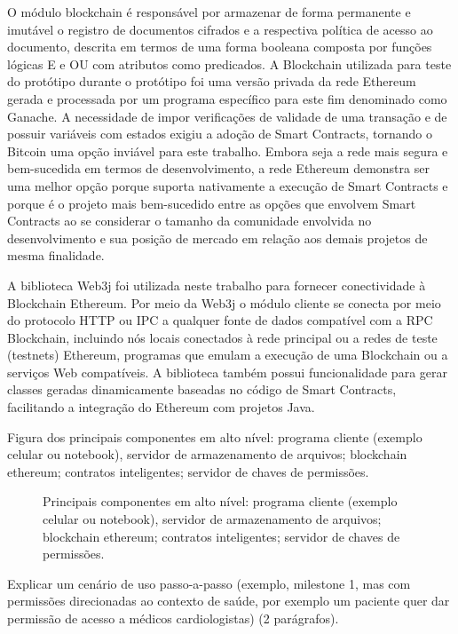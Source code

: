 \documentclass[a4paper,11pt]{article}
\begin{document}
O módulo blockchain é responsável por armazenar de forma permanente e imutável o registro de documentos cifrados e a respectiva política de acesso ao documento, descrita em termos de uma forma booleana composta por funções lógicas E e OU com atributos como predicados.
A Blockchain utilizada para teste do protótipo durante o protótipo foi uma versão privada da rede Ethereum gerada e processada por um programa específico para este fim denominado como Ganache.
A necessidade de impor verificações de validade de uma transação e de possuir variáveis com estados exigiu a adoção de Smart Contracts, tornando o Bitcoin uma opção inviável para este trabalho.
Embora seja a rede mais segura e bem-sucedida em termos de desenvolvimento, a rede Ethereum demonstra ser uma melhor opção porque suporta nativamente a execução de Smart Contracts e porque é o projeto mais bem-sucedido entre as opções que envolvem Smart Contracts ao se considerar o tamanho da comunidade envolvida no desenvolvimento e sua posição de mercado em relação aos demais projetos de mesma finalidade.

A biblioteca Web3j foi utilizada neste trabalho para fornecer conectividade à Blockchain Ethereum. Por meio da Web3j o módulo cliente se conecta por meio do protocolo HTTP ou IPC a qualquer fonte de dados compatível com a RPC Blockchain, incluindo nós locais conectados à rede principal ou a redes de teste (testnets) Ethereum, programas que emulam a execução de uma Blockchain ou a serviços Web compatíveis.
A biblioteca também possui funcionalidade para gerar classes geradas dinamicamente baseadas no código de Smart Contracts, facilitando a integração do Ethereum com projetos Java.

{\color{ForestGreen}Figura dos principais componentes em alto nível: programa cliente (exemplo celular ou notebook), servidor de armazenamento de arquivos; blockchain ethereum; contratos inteligentes; servidor de chaves de permissões.}

\begin{figure}[H]
  \centering
  
  \caption{Principais componentes em alto nível: programa cliente (exemplo celular ou notebook), servidor de armazenamento de arquivos; blockchain ethereum; contratos inteligentes; servidor de chaves de permissões.}
  \label{fig:diagramaDCPABE}
\end{figure}

{\color{ForestGreen}Explicar um cenário de uso passo-a-passo (exemplo, milestone 1, mas com permissões direcionadas ao contexto de saúde, por exemplo um paciente quer dar permissão de acesso a médicos cardiologistas) (2 parágrafos)}.
\end{document}
